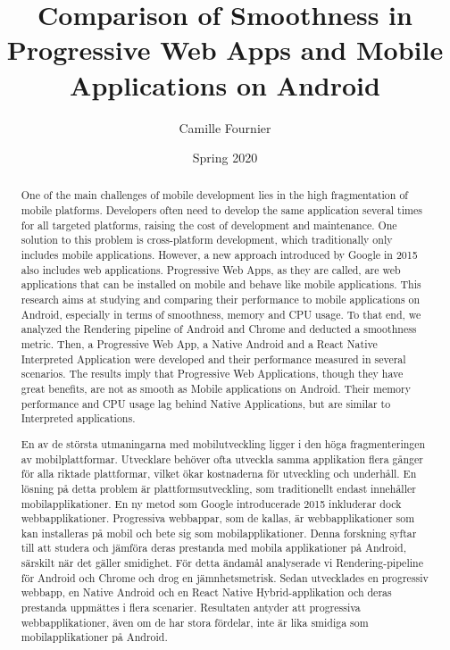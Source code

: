 \documentclass{kththesis}
\title{Comparison of Smoothness in Progressive Web Apps and Mobile Applications on Android}
\author{Camille Fournier}
\date{Spring 2020}
\begin{document}
\sloppy %


\frontmatter

\titlepage

\begin{abstract}    
  One of the main challenges of mobile development lies in the high fragmentation of mobile platforms. Developers often need to develop the same application several times for all targeted platforms, raising the cost of development and maintenance. One solution to this problem is cross-platform development, which traditionally only includes mobile applications. However, a new approach introduced by Google in 2015 also includes web applications. Progressive Web Apps, as they are called, are web applications that can be installed on mobile and behave like mobile applications. This research aims at studying and comparing their performance to mobile applications on Android, especially in terms of smoothness, memory and CPU usage. To that end, we analyzed the Rendering pipeline of Android and Chrome and deducted a smoothness metric. Then, a Progressive Web App, a Native Android and a React Native Interpreted Application were developed and their performance measured in several scenarios. The results imply that Progressive Web Applications, though they have great benefits, are not as smooth as Mobile applications on Android. Their memory performance and CPU usage lag behind Native Applications, but are similar to Interpreted applications. 
\end{abstract}


\begin{otherlanguage}{swedish}
  \begin{abstract}
En av de största utmaningarna med mobilutveckling ligger i den höga fragmenteringen av mobilplattformar. Utvecklare behöver ofta utveckla samma applikation flera gånger för alla riktade plattformar, vilket ökar kostnaderna för utveckling och underhåll. En lösning på detta problem är plattformsutveckling, som traditionellt endast innehåller mobilapplikationer. En ny metod som Google introducerade 2015 inkluderar dock webbapplikationer. Progressiva webbappar, som de kallas, är webbapplikationer som kan installeras på mobil och bete sig som mobilapplikationer. Denna forskning syftar till att studera och jämföra deras prestanda med mobila applikationer på Android, särskilt när det gäller smidighet. För detta ändamål analyserade vi Rendering-pipeline för Android och Chrome och drog en jämnhetsmetrisk. Sedan utvecklades en progressiv webbapp, en Native Android och en React Native Hybrid-applikation och deras prestanda uppmättes i flera scenarier. Resultaten antyder att progressiva webbapplikationer, även om de har stora fördelar, inte är lika smidiga som mobilapplikationer på Android.
  \end{abstract}
\end{otherlanguage}
\end{document}
